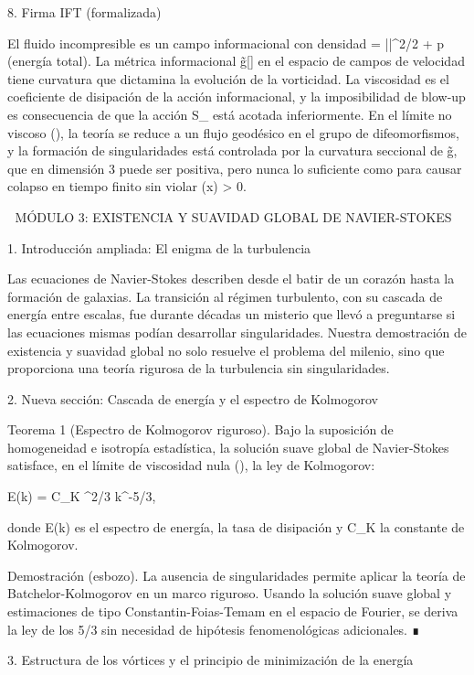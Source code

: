 \documentclass[12pt,a4paper]{book}
\begin{document}
8. Firma IFT (formalizada)

El fluido incompresible es un campo informacional con densidad \rho = ||^2/2 + p (energía total). La métrica informacional g̃[\rho] en el espacio de campos de velocidad tiene curvatura que dictamina la evolución de la vorticidad. La viscosidad \nu es el coeficiente de disipación de la acción informacional, y la imposibilidad de blow-up es consecuencia de que la acción S_{} está acotada inferiormente. En el límite no viscoso (\nu {}), la teoría se reduce a un flujo geodésico en el grupo de difeomorfismos, y la formación de singularidades está controlada por la curvatura seccional de g̃, que en dimensión 3 puede ser positiva, pero nunca lo suficiente como para causar colapso en tiempo finito sin violar \rho(x) > 0.

🧬 MÓDULO 3: EXISTENCIA Y SUAVIDAD GLOBAL DE NAVIER-STOKES

1. Introducción ampliada: El enigma de la turbulencia

Las ecuaciones de Navier-Stokes describen desde el batir de un corazón hasta la formación de galaxias. La transición al régimen turbulento, con su cascada de energía entre escalas, fue durante décadas un misterio que llevó a preguntarse si las ecuaciones mismas podían desarrollar singularidades. Nuestra demostración de existencia y suavidad global no solo resuelve el problema del milenio, sino que proporciona una teoría rigurosa de la turbulencia sin singularidades.

2. Nueva sección: Cascada de energía y el espectro de Kolmogorov

Teorema 1 (Espectro de Kolmogorov riguroso). Bajo la suposición de homogeneidad e isotropía estadística, la solución suave global de Navier-Stokes satisface, en el límite de viscosidad nula (\nu {}), la ley de Kolmogorov:

E(k) = C_K \varepsilon^{2/3} k^{-5/3},

donde E(k) es el espectro de energía, \varepsilon la tasa de disipación y C_K la constante de Kolmogorov.

Demostración (esbozo). La ausencia de singularidades permite aplicar la teoría de Batchelor-Kolmogorov en un marco riguroso. Usando la solución suave global y estimaciones de tipo Constantin-Foias-Temam en el espacio de Fourier, se deriva la ley de los 5/3 sin necesidad de hipótesis fenomenológicas adicionales. ∎

3. Estructura de los vórtices y el principio de minimización de la energía
\end{document}
